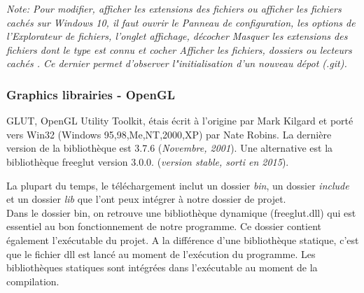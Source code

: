 \documentclass[12pt]{article}
\begin{document}
\emph{Note: Pour modifier, afficher les extensions des fichiers ou afficher les fichiers cachés sur Windows 10, il faut ouvrir le Panneau de configuration, les options de l'Explorateur de fichiers, l'onglet affichage, décocher \og Masquer les extensions des fichiers dont le type est connu \fg et cocher \og Afficher les fichiers, dossiers ou lecteurs cachés \fg. Ce dernier permet d'observer l"initialisation d'un nouveau dépot (.git).}\\

\subsubsection{Graphics librairies - OpenGL}
GLUT, OpenGL Utility Toolkit, étais écrit à l'origine par Mark Kilgard et porté vers Win32 (Windows 95,98,Me,NT,2000,XP) par Nate Robins. La dernière version de la bibliothèque est 3.7.6 (\emph{Novembre, 2001}). Une alternative est la bibliothèque freeglut version 3.0.0. (\emph{version stable, sorti en 2015}).\\



La plupart du temps, le téléchargement inclut un dossier \emph{bin}, un dossier \emph{include} et un dossier \emph{lib} que l'ont peux intégrer à notre dossier de projet.\\

Dans le dossier bin, on retrouve une bibliothèque dynamique (freeglut.dll) qui est essentiel au bon fonctionnement de notre programme. Ce dossier contient également l'exécutable du projet. A la différence d'une bibliothèque statique, c'est que le fichier dll est lancé au moment de l'exécution du programme. Les bibliothèques statiques sont intégrées dans l'exécutable au moment de la compilation.\\
\end{document}
